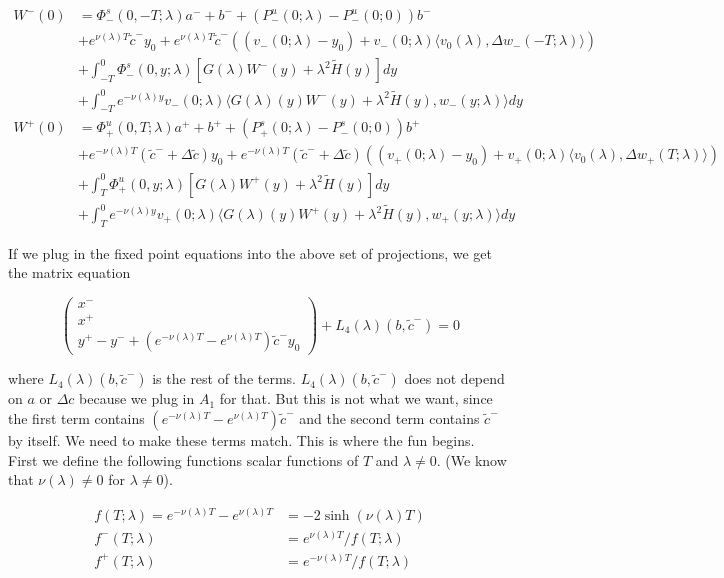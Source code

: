 \documentclass[12pt]{article}
\begin{document}
\begin{enumerate}
\begin{align*}
W^-(0) &= \Phi^s_-(0, -T; \lambda )a^- + b^- + (P^u_-(0; \lambda) - P^u_-(0; 0))b^- \\
&+ e^{\nu(\lambda)T} \tilde{c}^- y_0 + e^{\nu(\lambda)T} \tilde{c}^- ( (v_-(0; \lambda) - y_0) + v_-(0; \lambda) \langle  v_0(\lambda), \Delta w_-(-T; \lambda) \rangle) \\
&+ \int_{-T}^0 \Phi^s_-(0, y; \lambda) [ G(\lambda)W^-(y) + \lambda^2 \tilde{H}(y) ] dy \\
&+ \int_{-T}^0 
e^{-\nu(\lambda)y} v_-(0; \lambda) \langle G(\lambda)(y)W^-(y) + \lambda^2 \tilde{H}(y), w_-(y; \lambda) \rangle dy \\
W^+(0) &= \Phi^u_+(0, T; \lambda)a^+ + b^+ + (P^s_+(0; \lambda) - P^s_-(0; 0))b^+ \\
&+ e^{-\nu(\lambda)T} (\tilde{c}^- + \Delta \tilde{c}) y_0 + e^{-\nu(\lambda)T} (\tilde{c}^- + \Delta \tilde{c}) ( (v_+(0; \lambda) - y_0) + v_+(0; \lambda) \langle  v_0(\lambda), \Delta w_+(T; \lambda) \rangle) \\
&+ \int_T^0 \Phi^u_+(0, y; \lambda) [ G(\lambda)W^+(y) + \lambda^2 \tilde{H}(y) ] dy \\
&+ \int_T^0 e^{-\nu(\lambda)y} v_+(0; \lambda) \langle G(\lambda)(y)W^+(y) + \lambda^2 \tilde{H}(y), w_+(y; \lambda) \rangle dy
\end{align*}


If we plug in the fixed point equations into the above set of projections, we get the matrix equation

\[
\begin{pmatrix}x^- \\ x^+ \\ y^+ - y^- + (e^{-\nu(\lambda)T} - e^{\nu(\lambda)T}) \tilde{c}^- y_0 \end{pmatrix} + L_4(\lambda)(b, \tilde{c}^-) = 0
\]

where $L_4(\lambda)(b, \tilde{c}^-)$ is the rest of the terms. $L_4(\lambda)(b, \tilde{c}^-)$ does not depend on $a$ or $\Delta c$ because we plug in $A_1$ for that. But this is not what we want, since the first term contains $(e^{-\nu(\lambda)T} - e^{\nu(\lambda)T}) \tilde{c}^-$ and the second term contains $\tilde{c}^-$ by itself. We need to make these terms match. This is where the fun begins.
\\

First we define the following functions scalar functions of $T$ and $\lambda \neq 0$. (We know that $\nu(\lambda) \neq 0$ for $\lambda \neq 0$).

\begin{align*}
f(T; \lambda) = e^{-\nu(\lambda)T} - e^{\nu(\lambda)T} &= -2 \sinh (\nu(\lambda) T) \\
f^-(T; \lambda) &= e^{\nu(\lambda)T} / f(T; \lambda) \\
f^+(T; \lambda) &= e^{-\nu(\lambda)T} / f(T; \lambda)
\end{align*}


\end{enumerate}
\end{document}
